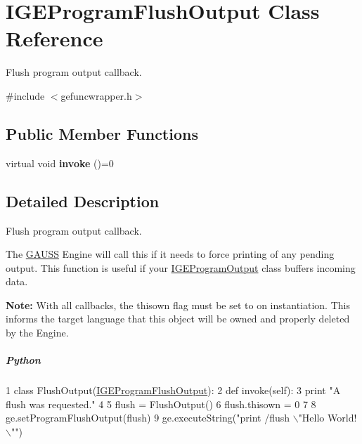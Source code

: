 \hypertarget{class_i_g_e_program_flush_output}{\section{I\-G\-E\-Program\-Flush\-Output Class Reference}
\label{class_i_g_e_program_flush_output}
}


Flush program output callback.  




{\ttfamily \#include $<$gefuncwrapper.\-h$>$}

\subsection*{Public Member Functions}
\begin{DoxyCompactItemize}
\item 
\hypertarget{class_i_g_e_program_flush_output_a2143086c607a7caac7f5e201cee512d3}{virtual void {\bfseries invoke} ()=0}\label{class_i_g_e_program_flush_output_a2143086c607a7caac7f5e201cee512d3}

\end{DoxyCompactItemize}


\subsection{Detailed Description}
Flush program output callback. 

The \hyperlink{class_g_a_u_s_s}{G\-A\-U\-S\-S} Engine will call this if it needs to force printing of any pending output. This function is useful if your \hyperlink{class_i_g_e_program_output}{I\-G\-E\-Program\-Output} class buffers incoming data.

{\bfseries Note\-:} With all callbacks, the {\ttfamily thisown} flag must be set to {} on instantiation. This informs the target language that this object will be owned and properly deleted by the Engine.

\subparagraph*{Python}


\begin{DoxyCode}
1 \textcolor{keyword}{class }FlushOutput(\hyperlink{class_i_g_e_program_flush_output}{IGEProgramFlushOutput}):
2     \textcolor{keyword}{def }invoke(self):
3         \textcolor{keywordflow}{print} \textcolor{stringliteral}{"A flush was requested."}
4 
5 flush = FlushOutput()
6 flush.thisown = 0
7 
8 ge.setProgramFlushOutput(flush)
9 ge.executeString(\textcolor{stringliteral}{"print /flush \(\backslash\)"Hello World!\(\backslash\)""})
\end{DoxyCode}



